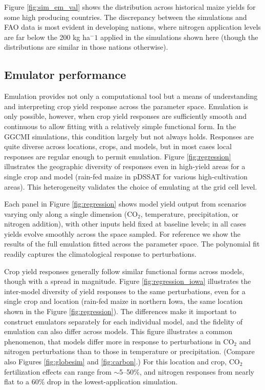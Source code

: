 \documentclass[preprint, 5p, times, twocolumn]{elsarticle}
\begin{document}
Figure \ref{fig:sim_em_val} shows the distribution across historical maize yields for some high producing countries. The discrepancy between the simulations and FAO data is most evident in developing nations, where nitrogen application levels are far below the 200 kg ha$^-1$ applied in the simulations shown here (though the distributions are similar in those nations otherwise). 

\subsection{Emulator performance}
Emulation provides not only a computational tool but a means of understanding and interpreting crop yield response across the parameter space. Emulation is only possible, however, when crop yield responses are sufficiently smooth and continuous to allow fitting with a relatively simple functional form. In the GGCMI simulations, this condition largely but not always holds. 
Responses are quite diverse across locations, crops, and models, but in most cases local responses are regular enough to permit emulation. Figure \ref{fig:regression} illustrates the geographic diversity of responses even in high-yield areas for a single crop and model (rain-fed maize in pDSSAT for various high-cultivation areas).  This heterogeneity validates the choice of emulating at the grid cell level. 

Each panel in Figure \ref{fig:regression} shows model yield output from scenarios varying only along a single dimension (CO$_2$, temperature, precipitation, or nitrogen addition), with other inputs held fixed at baseline levels; in all cases yields evolve smoothly across the space sampled. For reference we show the results of the full emulation fitted across the parameter space. The polynomial fit readily captures the climatological response to perturbations.

Crop yield responses generally follow similar functional forms across models, though with a spread in magnitude. Figure \ref{fig:regression_iowa} illustrates the inter-model diversity of yield responses to the same perturbations, even for a single crop and location (rain-fed maize in northern Iowa, the same location shown in the Figure \ref{fig:regression}). The differences make it important to construct emulators separately for each individual model, and the fidelity of emulation can also differ across models. This figure illustrates a common phenomenon, that models differ more in response to perturbations in CO$_2$ and nitrogen perturbations than to those in temperature or precipitation. (Compare also Figures \ref{fig:globesim} and \ref{fig:carbon}.) For this location and crop, CO$_2$ fertilization effects can range from $\sim$5--50\%, and nitrogen responses from nearly flat to a 60\% drop in the lowest-application simulation. 
\end{document}
